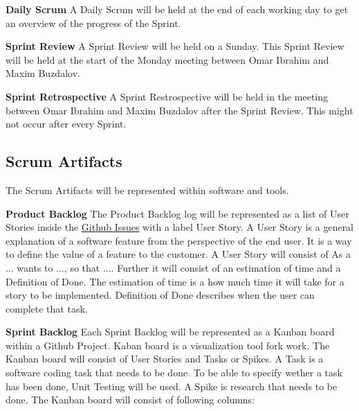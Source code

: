 \textbf{Daily Scrum}\newline
A Daily Scrum will be held at the end of each working day to get an overview of the progress of the Sprint.

\textbf{Sprint Review}\newline
A Sprint Review will be held on a Sunday. This Sprint Review will be held at the start of the Monday meeting between 
Omar Ibrahim and Maxim Buzdalov.

\textbf{Sprint Retrospective}\newline
A Sprint Restrospective will be held in the meeting between Omar Ibrahim and Maxim Buzdalov after the Sprint Review. 
This might not occur after every Sprint.

\subsection{Scrum Artifacts}
The Scrum Artifacts will be represented within software and tools.\newline

\textbf{Product Backlog}\newline
The Product Backlog log will be represented as a list of User Stories inside the 
\href{https://github.com/TheRealShoxie/Interactive-Robot-Chess/issues}{\color{blue}Github Issues} with a label User Story.
A User Story\cite{user_story} is a general explanation of a software feature from the perspective of 
the end user. It is a way to define the value of a feature to the customer. A User Story will consist of 
As a ... wants to ..., so that .... Further it will consist of an estimation of time and a Definition of Done. 
The estimation of time is a how much time it will take for a story to be implemented. Definition of Done describes when 
the user can complete that task.


\textbf{Sprint Backlog}\newline
Each Sprint Backlog will be represented as a Kanban board within a Github Project. Kaban board is a visualization tool 
fork work\cite{kanban_board}. The Kanban board will consist of User Stories and Tasks or Spikes. A Task is a software 
coding task that needs to be done. To be able to specify wether a task has been done, Unit Testing will be used. 
A Spike is research that needs to be done. The Kanban board will consist of following columns:


